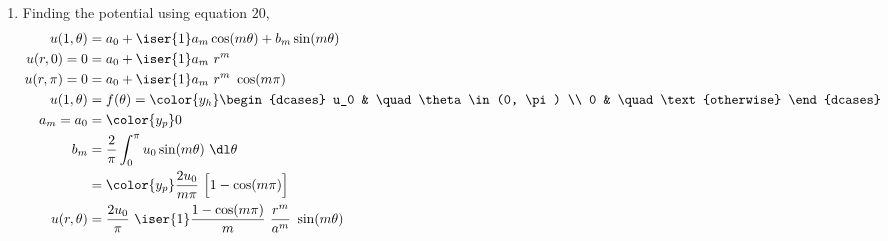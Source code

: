 \begin{enumerate}
    \item Finding the potential using equation $ 20 $,
          \begin{align}
              u(1, \theta)  & = a_0 + \iser{1} a_m \cos(m\theta) + b_m \sin(m\theta) \\
              u(r, 0) = 0   & = a_0 + \iser{1} a_m\ r^m                              \\
              u(r, \pi) = 0 & = a_0 + \iser{1} a_m\ r^m\ \cos(m\pi)                  \\
              u(1, \theta)  & = f(\theta) = \color{y_h}
              \begin{dcases}
                  u_0 & \quad \theta \in (0, \pi) \\
                  0   & \quad \text{otherwise}
              \end{dcases}                                        \\
              a_m = a_0     & = \color{y_p} 0                                        \\
              b_m           & = \frac{2}{\pi} \int_{0}^{\pi} u_0 \sin(m\theta)
              \ \dl \theta                                                           \\
                            & = \color{y_p} \frac{2u_0}{m \pi}\ \Big[
              1 - \cos(m\pi) \Big]                                                   \\
              u(r, \theta)  & = \frac{2u_0}{\pi}\ \iser{1} \frac{1 - \cos(m\pi)}
              {m}\ \frac{r^m}{a^m}\ \sin(m\theta)
          \end{align}


\end{enumerate}
